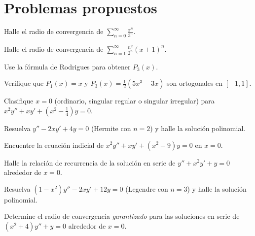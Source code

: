 \section{Problemas propuestos}

\begin{prob}
Halle el radio de convergencia de $\displaystyle\sum_{n=0}^{\infty} \frac{x^n}{3^n}$.
\end{prob}

\begin{prob}
Halle el radio de convergencia de $\displaystyle\sum_{n=1}^{\infty} \frac{n^2}{2^n}(x+1)^n$.
\end{prob}

\begin{prob}
Use la fórmula de Rodrigues para obtener $P_3(x)$.
\end{prob}

\begin{prob}
Verifique que $P_1(x)=x$ y $P_3(x)=\tfrac12(5x^3-3x)$ son ortogonales en $[-1,1]$.
\end{prob}

\begin{prob}
Clasifique $x=0$ (ordinario, singular regular o singular irregular) para $x^2 y'' + x y' + (x^2-\tfrac14)y=0$.
\end{prob}

\begin{prob}
Resuelva $y'' - 2x y' + 4y = 0$ (Hermite con $n=2$) y halle la solución polinomial.
\end{prob}

\begin{prob}
Encuentre la ecuación indicial de $x^2 y'' + x y' + (x^2-9)y=0$ en $x=0$.
\end{prob}

\begin{prob}
Halle la relación de recurrencia de la solución en serie de $y'' + x^2 y' + y = 0$ alrededor de $x=0$.
\end{prob}

\begin{prob}
Resuelva $(1-x^2)y'' - 2x y' + 12y = 0$ (Legendre con $n=3$) y halle la solución polinomial.
\end{prob}

\begin{prob}
Determine el radio de convergencia \emph{garantizado} para las soluciones en serie de $(x^2+4)y'' + y = 0$ alrededor de $x=0$.
\end{prob}

